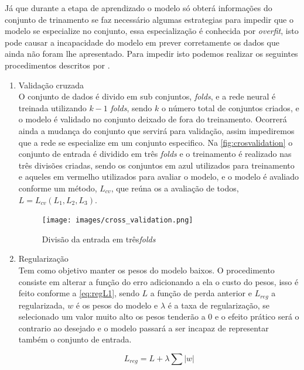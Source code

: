 \documentclass[
    12pt,
    oneside,
    a4paper,
    english,
    brazil
]{abntex2}
\begin{document}
Já  que  durante  a  etapa  de  aprendizado  o  modelo  só  obterá  informações
do  conjunto  de   trinamento  se  faz  necessário   algumas  estrategias  para
impedir  que  o  modelo  se  especialize no  conjunto,  essa  especialização  é
conhecida por  \textit{overfit}, isto pode  causar a incapacidade do  modelo em
prever  corretamente  os  dados  que  ainda não  foram  lhe  apresentado.  Para
impedir  isto  podemos  realizar   os  seguintes  procedimentos  descritos  por
.

\begin{enumerate}
    \item Validação cruzada\\
        O conjunto de dados é divido em sub conjuntos, \textit{folds}, e a rede
        neural é treinada  utilizando $k-1$ \textit{folds}, sendo  $k$ o número
        total de conjuntos  criados, e o modelo é validado  no conjunto deixado
        de  fora do  treinamento.  Ocorrerá  ainda a  mudança  do conjunto  que
        servirá para validação, assim impediremos  que a rede se especialize em
        um conjunto  especifico. Na \autoref{fig:crosvalidation} o  conjunto de
        entrada é dividido  em três \textit{folds} e o  treinamento é realizado
        nas três divisões  criadas, sendo os conjuntos em  azul utilizados para
        treinamento e aqueles em vermelho utilizados para avaliar o modelo, e o
        modelo  é  avaliado  conforme  um  método, $L_{cv}$,  que  reúna  os  a
        avaliação de todos, $L = L_{cv}(L_1, L_2, L_3)$.

        \begin{figure}[ht]
            \centering
            \caption{Divisão da entrada em três\textit{folds}}\label{fig:crosvalidation}
            \texttt{[image: images/cross\_validation.png]}
        \end{figure}

    \item Regularização\\
        Tem  como objetivo  manter os  pesos do  modelo baixos.  O procedimento
        consiste  em alterar  a função  do erro  adicionando a  ela o  custo do
        pesos, isso é  feito conforme a \autoref{eq:regL1}, sendo  $L$ a função
        de perda anterior e $L_{reg}$ a  regularizada, $w$ é os pesos do modelo
        e $\lambda$  é a taxa de  regularização, se selecionado um  valor muito
        alto os  pesos tenderão a  $0$ e o efeito  prático será o  contrario ao
        desejado  e o  modelo passará  a ser  incapaz de  representar também  o
        conjunto de entrada.

        \begin{equation}\label{eq:regL1}
            L_{reg} = L + \lambda \sum{|w|}
        \end{equation}
\end{enumerate}
\end{document}
